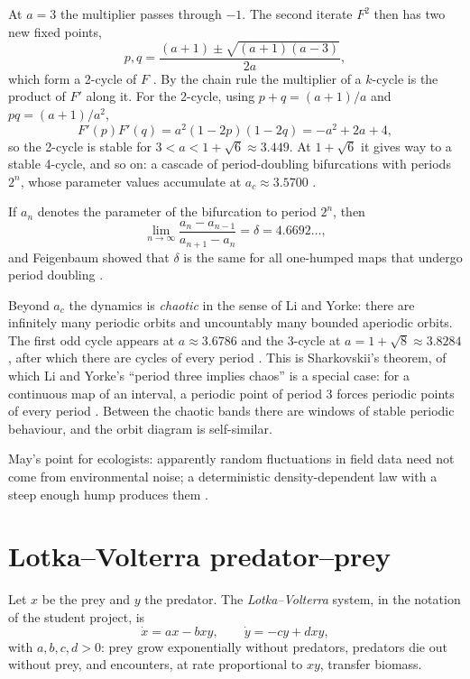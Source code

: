 At $a=3$ the multiplier passes through
$-1$. The second iterate $F^{2}$ then has
two new fixed points,
$$
p, q =
\frac{(a+1)\pm\sqrt{(a+1)(a-3)}}{2a},
$$
which form a 2-cycle of $F$
\cite[Section 2.3]{murray2002mathematical}.
By the chain rule the multiplier of a
$k$-cycle is the product of $F'$ along it.
For the 2-cycle, using $p+q=(a+1)/a$ and
$pq=(a+1)/a^2$,
$$
F'(p)F'(q) = a^2(1-2p)(1-2q)
= -a^2+2a+4,
$$
so the 2-cycle is stable for
$3<a<1+\sqrt{6}\approx 3.449$. At
$1+\sqrt 6$ it gives way to a stable
4-cycle, and so on: a cascade of
period-doubling bifurcations with periods
$2^n$, whose parameter values accumulate at
$a_c \approx 3.5700$ \cite{may1976simple}.

\begin{remark}
\label{remark-feigenbaum}
If $a_{n}$ denotes the parameter of the
bifurcation to period $2^{n}$, then
$$
\lim_{n\to\infty}
\frac{a_{n}-a_{n-1}}{a_{n+1}-a_{n}}
= \delta = 4.6692\ldots,
$$
and Feigenbaum showed that $\delta$ is the
same for all one-humped maps that undergo
period doubling
\cite[Section 2.3]{murray2002mathematical}.
\end{remark}

Beyond $a_c$ the dynamics is
\emph{chaotic} in the sense of Li and Yorke:
there are infinitely many periodic orbits
and uncountably many bounded aperiodic
orbits. The first odd cycle appears at
$a\approx 3.6786$ and the 3-cycle at
$a = 1+\sqrt 8 \approx 3.8284$, after which
there are cycles of every period
\cite{may1976simple}. This is Sharkovskii's
theorem, of which Li and Yorke's ``period
three implies chaos'' is a special case:
for a continuous map of an interval, a
periodic point of period $3$ forces periodic
points of every period
\cite[Section 2.3]{murray2002mathematical}.
Between the chaotic bands there are
windows of stable periodic behaviour, and
the orbit diagram is self-similar.

\begin{remark}
\label{remark-may-message}
May's point for ecologists: apparently
random fluctuations in field data need not
come from environmental noise; a
deterministic density-dependent law with a
steep enough hump produces them
\cite{may1976simple}.
\end{remark}

\section{Lotka--Volterra predator--prey}
\label{section-lotka-volterra}

Let $x$ be the prey and $y$ the predator.
The \emph{Lotka--Volterra} system, in the
notation of the student project, is
\begin{equation}
\label{equation-lotka-volterra}
\dot x = ax - bxy,
\qquad
\dot y = -cy + dxy,
\end{equation}
with $a,b,c,d>0$: prey grow exponentially
without predators, predators die out
without prey, and encounters, at rate
proportional to $xy$, transfer biomass.

